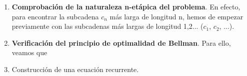 \begin{enumerate}
    \item \textbf{Comprobación de la naturaleza n-etápica del problema}. En efecto, 
    para encontrar la subcadena $c_n$ más larga de longitud n, hemos de empezar 
    previamente con las subcadenas más largas de longitud 1,2... ($c_1$, $c_2$, ...). 

    \item \textbf{Verificación del principio de optimalidad de Bellman}. Para ello, 
    veamos que 
    \item Construcción de una ecuación recurrente. 
\end{enumerate}






